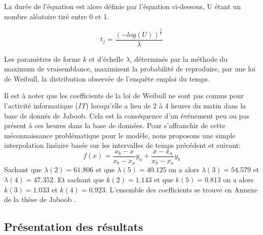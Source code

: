 La durée de l'équation est alors définie par l'équation ci-dessous, U étant un nombre aléatoire tiré entre 0 et 1. 

\begin{equation}
t_{j}=\frac{(-log(U))^{\frac{1}{k}}}{\lambda}
\end{equation}

Les paramètres de forme $k$ et d'échelle $\lambda$, déterminés par la méthode du maximum de vraisemblance, maximisent la probabilité de reproduire, par une loi de Weibull, la distribution observée de l'enquête emploi du temps.

Il est à noter que les coefficients de la loi de Weibull ne sont pas connus pour l'activité informatique (\textit{IT}) lorsqu'elle a lieu de 2 à 4 heures du matin dans la base de donnés de Jaboob. Cela est la conséquence d'un événement peu ou pas présent à ces heures dans la base de données. Pour s'affranchir de cette méconnaissance problématique pour le modèle, nous proposons une simple interpolation linéaire basée sur les intervalles de temps précédent et suivant:
\begin{equation}
f(x)=\frac{x_{b}-x}{x_{b}-x_{a}}y_{a}+\frac{x-x_{a}}{x_{b}-x_{a}}y_{b}
\end{equation}
Sachant que $\lambda(2)=61.806$ et que $\lambda(5)=40.125$ on a alors $\lambda(3)=54.579$ et $\lambda(4)=47.352$. Et sachant que $k(2)=1.143$ et que $k(5)=0.813$ on a alors $k(3)=1.033$ et $k(4)=0.923$. L'ensemble des coefficients se trouve en Annexe de la thèse de Jaboob \cite{Jaboob-16}.

\subsection{Présentation des résultats}


